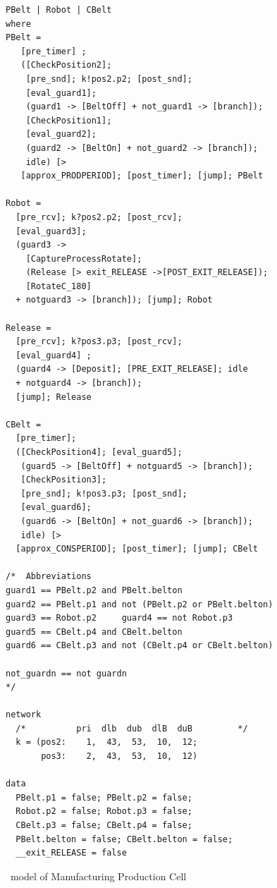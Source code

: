 \begin{figure}
\scriptsize
\begin{verbatim}
PBelt | Robot | CBelt
where
PBelt = 
   [pre_timer] ; 
   ([CheckPosition2]; 
    [pre_snd]; k!pos2.p2; [post_snd];
    [eval_guard1]; 
    (guard1 -> [BeltOff] + not_guard1 -> [branch]);
    [CheckPosition1]; 
    [eval_guard2]; 
    (guard2 -> [BeltOn] + not_guard2 -> [branch]); 
    idle) [> 
   [approx_PRODPERIOD]; [post_timer]; [jump]; PBelt

Robot =
  [pre_rcv]; k?pos2.p2; [post_rcv];
  [eval_guard3]; 
  (guard3 -> 
    [CaptureProcessRotate]; 
    (Release [> exit_RELEASE ->[POST_EXIT_RELEASE]);
    [RotateC_180] 
  + notguard3 -> [branch]); [jump]; Robot

Release =
  [pre_rcv]; k?pos3.p3; [post_rcv]; 
  [eval_guard4] ; 
  (guard4 -> [Deposit]; [PRE_EXIT_RELEASE]; idle 
  + notguard4 -> [branch]); 
  [jump]; Release

CBelt =
  [pre_timer];
  ([CheckPosition4]; [eval_guard5];
   (guard5 -> [BeltOff] + notguard5 -> [branch]); 
   [CheckPosition3]; 
   [pre_snd]; k!pos3.p3; [post_snd];
   [eval_guard6]; 
   (guard6 -> [BeltOn] + not_guard6 -> [branch]); 
   idle) [> 
  [approx_CONSPERIOD]; [post_timer]; [jump]; CBelt

/*  Abbreviations
guard1 == PBelt.p2 and PBelt.belton   
guard2 == PBelt.p1 and not (PBelt.p2 or PBelt.belton)
guard3 == Robot.p2     guard4 == not Robot.p3
guard5 == CBelt.p4 and CBelt.belton   
guard6 == CBelt.p3 and not (CBelt.p4 or CBelt.belton)

not_guardn == not guardn
*/

network
  /*          pri  dlb  dub  dlB  duB         */
  k = (pos2:    1,  43,  53,  10,  12;  
       pos3:    2,  43,  53,  10,  12)

data
  PBelt.p1 = false; PBelt.p2 = false;
  Robot.p2 = false; Robot.p3 = false; 
  CBelt.p3 = false; CBelt.p4 = false; 
  PBelt.belton = false; CBelt.belton = false;
  __exit_RELEASE = false
\end{verbatim}
\caption{\bcandle\ model of Manufacturing Production Cell \label{fig:mpcbc}} 
\end{figure}
